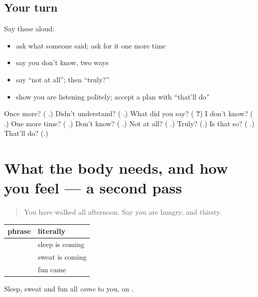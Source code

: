 \subsection*{Your turn}
Say these aloud:

\begin{itemize}
\raggedright
  \item ask what someone said; ask for it one more time
  \item say you don't know, two ways
  \item say \textquotedblleft{}not at all\textquotedblright{}; then \textquotedblleft{}truly?\textquotedblright{}
  \item show you are listening politely; accept a plan with \textquotedblleft{}that'll do\textquotedblright{}
\end{itemize}

\begin{tcolorbox}[breakable,colback=teal!4,colframe=teal!35!black,title={Before you move on}]
Once more? (\textbf{ }.) Didn't understand? (\textbf{  }.) What did you say? (\textbf{ ?}) I don't know? (\textbf{  }.) One more time? (\textbf{  }.) Don't know? (\textbf{ }.) Not at all? (\textbf{ }.) Truly? (\textbf{}.) Is that so? (\textbf{ }.) That'll do? (\textbf{}.)
\end{tcolorbox}
\section[(dialogue)]{What the body needs, and how you feel — a second pass}

\label{lesson:HI-R127-second-pass-body-mood}



\begin{quote}
You have walked all afternoon. Say you are hungry, and thirsty.
\end{quote}

\begin{grammarlens}[title={Grammar Lens: things that come to you}]
\noindent
\begin{tabularx}{\linewidth}{@{}>{\raggedright\arraybackslash}X>{\raggedright\arraybackslash}X@{}}
\toprule
\textbf{phrase} & \textbf{literally} \\
\midrule
\textbf{\hi{नींद} \hi{आ} \hi{रही} \hi{है}} & sleep is coming \\
\textbf{\hi{पसीना} \hi{आ} \hi{रहा} \hi{है}} & sweat is coming \\
\textbf{\hi{मज़ा} \hi{आया}} & fun came \\
\bottomrule
\end{tabularx}

Sleep, sweat and fun all \emph{come} to you, on \textbf{}.
\end{grammarlens}

